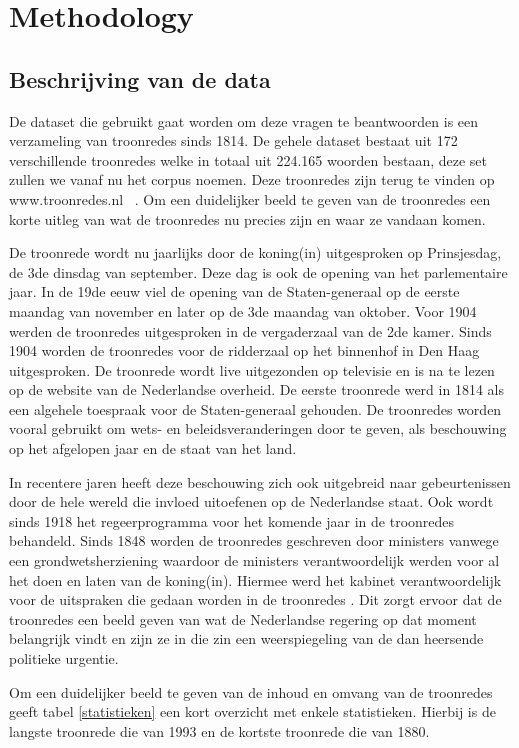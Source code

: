 \section{Methodology}
\label{sec:meth}


\subsection{Beschrijving van de data}
De dataset die gebruikt gaat worden om deze vragen te beantwoorden is een verzameling van troonredes sinds 1814. De gehele dataset bestaat uit 172 verschillende troonredes welke in totaal uit 224.165 woorden bestaan, deze set zullen we vanaf nu het corpus noemen. Deze troonredes zijn terug te vinden op www.troonredes.nl~\citep{troonredes} . Om een duidelijker beeld te geven van de troonredes een korte uitleg van wat de troonredes nu precies zijn en waar ze vandaan komen. 

De troonrede wordt nu jaarlijks door de koning(in) uitgesproken op Prinsjesdag, de 3de dinsdag van september. Deze dag is ook de opening van het parlementaire jaar. In de 19de eeuw viel de opening van de Staten-generaal op de eerste maandag van november en later op de 3de maandag van oktober. Voor 1904 werden de troonredes uitgesproken in de vergaderzaal van de 2de kamer. Sinds 1904 worden de troonredes voor de ridderzaal op het binnenhof in Den Haag uitgesproken. De troonrede wordt live uitgezonden op televisie en is na te lezen op de website van de Nederlandse overheid. De eerste troonrede werd in 1814 als een algehele toespraak voor de Staten-generaal gehouden. De troonredes worden vooral gebruikt om wets- en beleidsveranderingen door te geven, als beschouwing op het afgelopen jaar en de staat van het land. 

In recentere jaren heeft deze beschouwing zich ook uitgebreid naar gebeurtenissen door de hele wereld die invloed uitoefenen op de Nederlandse staat. Ook wordt sinds 1918 het regeerprogramma voor het komende jaar in de troonredes behandeld. Sinds 1848 worden de troonredes geschreven door ministers vanwege een grondwetsherziening waardoor de ministers verantwoordelijk werden voor al het doen en laten van de koning(in). Hiermee werd het kabinet verantwoordelijk voor de uitspraken die gedaan worden in de troonredes \citep{overheid}. Dit zorgt ervoor dat de troonredes een beeld geven van wat de Nederlandse regering op dat moment belangrijk vindt en zijn ze in die zin een weerspiegeling van de dan heersende politieke urgentie.

Om een duidelijker beeld te geven van de inhoud en omvang van de troonredes geeft tabel \ref{statistieken} een kort overzicht met enkele statistieken. Hierbij is de langste troonrede die van 1993 en de kortste troonrede die van 1880.

